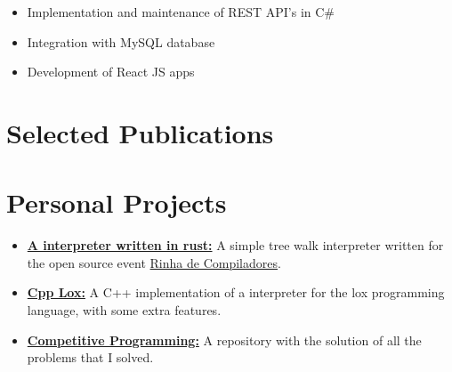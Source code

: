 \documentclass[11pt,a4paper,sans]{moderncv}        %
\begin{document}
\vspace{+1.0em}

\vspace{-1.5em}\begin{small}
    \begin{itemize}
\item Implementation and maintenance of REST API's in C\# 
\item Integration with MySQL database 
\item Development of React JS apps 
    \end{itemize}
\end{small}

\section{Selected Publications}

    
\section{Personal Projects}
\begin{itemize}
\setlength\itemsep{0.65em}
\item \href{https://github.com/RosaUlisses/Compilers-Rinha/tree/main/interpreter}{\textbf{A interpreter written in rust:}} A simple tree walk interpreter written for the open source event \href{https://github.com/aripiprazole/rinha-de-compiler}{Rinha de Compiladores}.  

\item \href{https://github.com/RosaUlisses/CppLox}{\textbf{Cpp Lox:}} A C++ implementation of a interpreter for the lox programming language, with some extra features.  

\item \href{https://github.com/RosaUlisses/Competitive-Programming}{\textbf{Competitive Programming:}} A repository with the solution of all the problems that I solved.

\end{itemize}
\end{document}
